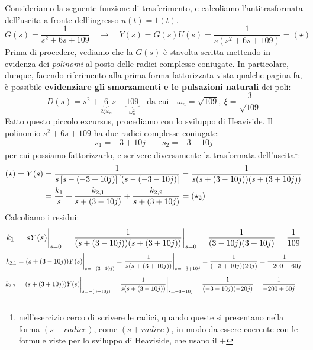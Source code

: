 \begin{esem}
Consideriamo la seguente funzione di trasferimento, e calcoliamo l'antitrasformata dell'uscita a fronte dell'ingresso $u(t) = 1(t)$.
\begin{equation*}
G(s) = \frac{1}{s^2+6s+109} \quad \rightarrow \quad Y(s) = G(s) U(s) = \frac{1}{s(s^2+6s+109)} = (\star)
\end{equation*}
Prima di procedere, vediamo che la $G(s)$ è stavolta scritta mettendo in evidenza dei \textit{polinomi} al posto delle radici complesse coniugate. In particolare, dunque, facendo riferimento alla prima forma fattorizzata vista qualche pagina fa, è possibile \textbf{evidenziare gli smorzamenti e le pulsazioni naturali} dei poli:
\begin{equation*}
D(s) = s^2 + \underbrace{6}_{2\xi \omega_n}s + \underbrace{109}_{\omega_n^2} \quad \textrm{da cui} \quad \omega_n = \sqrt{109}, \ \xi = \frac{3}{\sqrt{109}}
\end{equation*}
Fatto questo piccolo excursus, procediamo con lo sviluppo di Heaviside. Il polinomio $s^2 + 6s + 109$ ha due radici complesse coniugate:
\begin{equation*}
s_1=-3+10j \quad \quad s_2=-3-10j
\end{equation*}
per cui possiamo fattorizzarlo, e scrivere diversamente la trasformata dell'uscita\footnote{nell'esercizio cerco di scrivere le radici, quando queste si presentano nella forma $(s-radice)$, come $(s+radice)$, in modo da essere coerente con le formule viste per lo sviluppo di Heaviside, che usano il $+$}:
\begin{align*}
(\star) = Y(s) & = \frac{1}{s\left[ s-(-3+10j) \right]\left[ (s-(-3-10j) \right]} = \frac{1}{s(s+(3-10j))(s+(3+10j))} \\ & =\frac{k_1}{s} + \frac{k_{2,1}}{s+(3-10j)} +\frac{k_{2,2}}{s+(3+10j)} = (\star_2)
\end{align*}
Calcoliamo i residui:
\begin{equation*}
k_1 = \eval{sY(s)}_{s=0} = \eval{\frac{1}{(s+(3-10j))(s+(3+10j))}}_{s=0} = \frac{1}{(3-10j)(3+10j)} = \frac{1}{109}
\end{equation*}
\begin{align*}
\eval{k_{2,1} = (s+(3-10j))Y(s)}_{s=-(3-10j)} = \eval{\frac{1}{s(s+(3+10j))}}_{s=-3+10j} = \frac{1}{(-3+10j)(20j)} = \frac{1}{-200-60j}
\end{align*}
\begin{align*}
k_{2,2} & = \eval{(s+(3+10j))Y(s)}_{s=-(3+10j)} = \eval{\frac{1}{s(s+(3-10j))}}_{s=-3-10j} = \frac{1}{(-3-10j)(-20j)} = \frac{1}{-200+60j}

\end{align*}
\end{esem}
